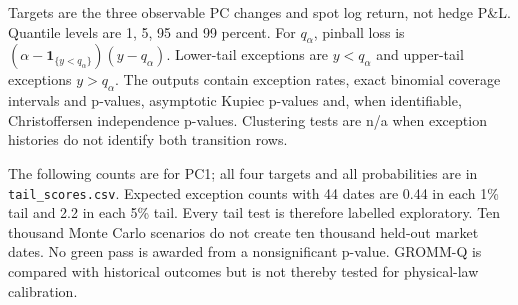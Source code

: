 \documentclass[11pt]{article}
\begin{document}
Targets are the three observable PC changes and spot log return, not hedge P\&L. Quantile levels are 1, 5, 95 and 99 percent. For $q_\alpha$, pinball loss is $(\alpha-\mathbf1_{\{y<q_\alpha\}})(y-q_\alpha)$. Lower-tail exceptions are $y<q_\alpha$ and upper-tail exceptions $y>q_\alpha$. The outputs contain exception rates, exact binomial coverage intervals and p-values, asymptotic Kupiec p-values and, when identifiable, Christoffersen independence p-values. Clustering tests are n/a when exception histories do not identify both transition rows.

The following counts are for PC1; all four targets and all probabilities are in \texttt{tail\_scores.csv}. Expected exception counts with 44 dates are 0.44 in each 1\% tail and 2.2 in each 5\% tail. Every tail test is therefore labelled exploratory. Ten thousand Monte Carlo scenarios do not create ten thousand held-out market dates. No green pass is awarded from a nonsignificant p-value. GROMM-Q is compared with historical outcomes but is not thereby tested for physical-law calibration.
\end{document}

